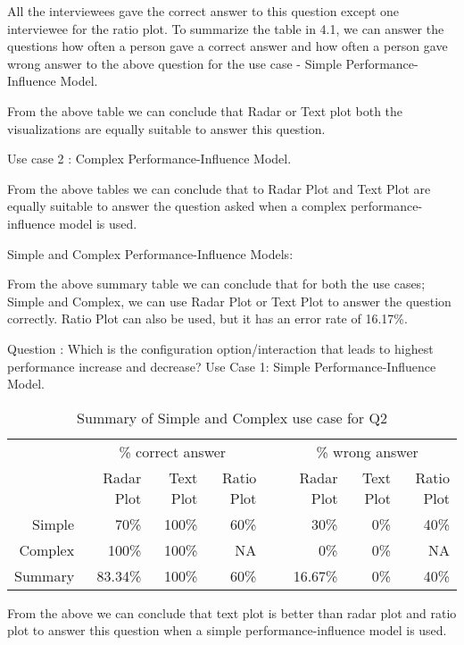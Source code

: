 All the interviewees gave the correct answer to this question except one interviewee for the ratio plot.
To summarize the table in 4.1, we can answer the questions how often a person gave a correct answer and how often a person gave wrong answer to the above question for the use case - Simple Performance-Influence Model.

From the above table we can conclude that Radar or Text plot both the visualizations are equally suitable to answer this question.

Use case 2 : Complex Performance-Influence Model.


From the above tables we can conclude that to Radar Plot and Text Plot are equally suitable to answer the question asked when a complex performance-influence model is used.

Simple and Complex Performance-Influence Models:

From the above summary table we can conclude that for both the use cases; Simple and Complex, we can use Radar Plot or Text Plot to answer the question correctly. Ratio Plot can also be used, but it has an error rate of 16.17\%.



Question : Which is the configuration option/interaction that leads to highest performance increase and decrease?
\newline
\newline
Use Case 1: Simple Performance-Influence Model.

\begin{table*}[htbp]
\begin{tabular}{@{}rrrrcrrr@{}}\toprule
    & \multicolumn{3}{c}{\% correct answer} & \phantom{abc}& \multicolumn{3}{c}{\% wrong answer} \\
\cmidrule{2-4} \cmidrule{6-8} \cmidrule{10-12}
& Radar Plot & Text Plot & Ratio Plot && Radar Plot & Text Plot & Ratio Plot \\ \midrule
Simple & 70\% & 100\% & 60\% && 30\% & 0\% & 40\% \\
Complex & 100\% & 100\% & NA && 0\% & 0\% & NA\\
\toprule
Summary & 83.34\% & 100\% & 60\% && 16.67\% & 0\% & 40\%\\
\bottomrule
\end{tabular}
\caption{Summary of Simple and Complex use case for Q2}
\end{table*}


From the above we can conclude that text plot is better than radar plot and ratio plot to answer this question when a simple performance-influence model is used.

